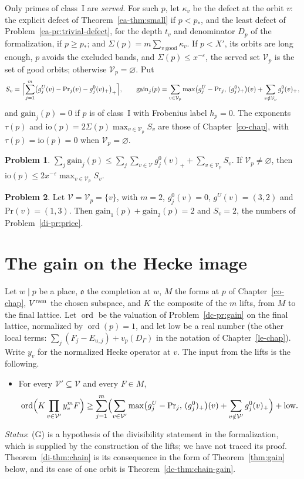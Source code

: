 \documentclass[reqno]{amsart}
\newcounter{chap}
\theoremstyle{definition}
\newtheorem{problem}{Problem}[section]
\theoremstyle{plain}
\theoremstyle{remark}
\newcommand{\Vc}{\mathcal V}
\renewcommand{\Pr}{\mathrm{Pr}}
\newcommand{\gain}{\mathrm{gain}}
\newcommand{\io}{\mathrm{io}}
\newcommand{\ord}{\operatorname{ord}}
\newcommand{\vo}{\mathfrak o}
\begin{document}
Only primes of class~I are \emph{served}.  For such \(p\), let \(\kappa_v\) be the defect at the orbit \(v\): the explicit defect of Theorem~\ref{ea-thm:small} if \(p<p_*\), and the least defect of Problem~\ref{ea-pr:trivial-defect}, for the depth \(t_v\) and denominator \(D_p\) of the formalization, if \(p\ge p_*\); and \(\Sigma(p)=m\sum_{v\ \text{good}}\kappa_v\).  If \(p<X'\), its orbits are long enough, \(p\) avoids the excluded bands, and \(\Sigma(p)\le x^{-\varepsilon}\), the served set \(\Vc_p\) is the set of good orbits; otherwise \(\Vc_p=\varnothing\).  Put
\[
 S_v=\Bigl\lceil\sum_{j=1}^m\bigl(g^U_j(v)-\Pr_j(v)-g^0_j(v)_+\bigr)_+\Bigr\rceil ,\qquad
 \gain_j(p)=\sum_{v\in\Vc_p}\max\bigl(g^U_j-\Pr_j,\,(g^0_j)_+\bigr)(v)+\sum_{v\notin\Vc_p}g^0_j(v)_+ ,
\]
and \(\gain_j(p)=0\) if \(p\) is of class~I with Frobenius label \(h_p=0\).  The exponents \(\tau(p)\) and \(\io(p)=2\Sigma(p)\max_{v\in\Vc_p}S_v\) are those of Chapter~\ref{co-chap}, with \(\tau(p)=\io(p)=0\) when \(\Vc_p=\varnothing\).

\begin{problem}\label{pr:gain-vs-S}
\(\sum_j\gain_j(p)\le\sum_j\sum_{v\in\Vc}g^0_j(v)_++\sum_{v\in\Vc_p}S_v\).  If \(\Vc_p\ne\varnothing\), then \(\io(p)\le2x^{-\varepsilon}\max_{v\in\Vc_p}S_v\).
\end{problem}

\begin{problem}\label{pr:price-check}
Let \(\Vc=\Vc_p=\{v\}\), with \(m=2\), \(g^0_j(v)=0\), \(g^U(v)=(3,2)\) and \(\Pr(v)=(1,3)\).  Then \(\gain_1(p)+\gain_2(p)=2\) and \(S_v=2\), the numbers of Problem~\ref{di-pr:price}.
\end{problem}

\section{The gain on the Hecke image}\label{sec:gain}

Let \(w\mid p\) be a place, \(\vo\) the completion at \(w\), \(M\) the forms at \(p\) of Chapter~\ref{co-chap}, \(V^{\rm ram}\) the chosen subspace, and \(K\) the composite of the \(m\) lifts, from \(M\) to the final lattice.  Let \(\ord\) be the valuation of Problem~\ref{dc-pr:gain} on the final lattice, normalized by \(\ord(p)=1\), and let \(\mathrm{low}\) be a real number (the other local terms: \(\sum_j(F_j-E_{u,j})+v_p(D_\Gamma)\) in the notation of Chapter~\ref{le-chap}).  Write \(y_v\) for the normalized Hecke operator at \(v\).  The input from the lifts is the following.
\begin{itemize}
\item[(G)] For every \(\Vc'\subseteq\Vc\) and every \(F\in M\),
\[
 \ord\Bigl(K\prod_{v\in\Vc'}y_v^mF\Bigr)\ge\sum_{j=1}^m\Bigl(\sum_{v\in\Vc'}\max\bigl(g^U_j-\Pr_j,\,(g^0_j)_+\bigr)(v)+\sum_{v\notin\Vc'}g^0_j(v)_+\Bigr)+\mathrm{low}.
\]
\end{itemize}
\emph{Status}: (G) is a hypothesis of the divisibility statement in the formalization, which is supplied by the construction of the lifts; we have not traced its proof.  Theorem~\ref{di-thm:chain} is its consequence in the form of Theorem~\ref{thm:gain} below, and its case of one orbit is Theorem~\ref{dc-thm:chain-gain}.
\end{document}
